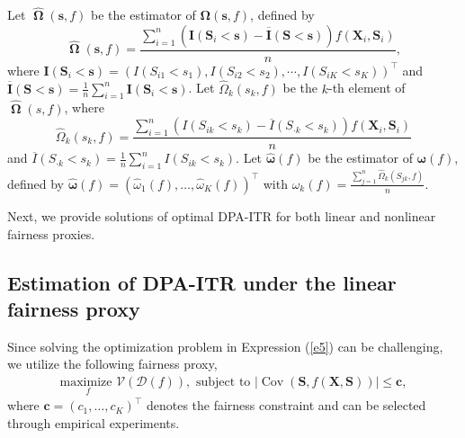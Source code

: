 \documentclass[12pt]{article}
\theoremstyle{plain}
\theoremstyle{definition}
\theoremstyle{remark}
\begin{document}
Let $\widehat{\operatorname{\boldsymbol{\Omega}}}(\boldsymbol{s},f)$ be the estimator of $\boldsymbol{\Omega}(\boldsymbol{s},f)$, defined by
$$
\widehat{\operatorname{\boldsymbol{\Omega}}}(\boldsymbol{s},f)
= \frac{\sum_{i=1}^n(\boldsymbol{I}(\boldsymbol{S}_i<\boldsymbol{s})-\overline{\boldsymbol{I}}(\boldsymbol{S}<\boldsymbol{s}))f(\boldsymbol{X}_i,\boldsymbol{S}_i)}{n},
$$
where $\boldsymbol{I}(\boldsymbol{S}_i<\boldsymbol{s})=(I({S}_{i1}<{s}_1), I({S}_{i2}<{s}_2), \cdots, I({S}_{iK}<{s}_K) )^\top$ and $\overline{\boldsymbol{I}}(\boldsymbol{S}<\boldsymbol{s})=\frac{1}{n}\sum_{i=1}^n\boldsymbol{I}(\boldsymbol{S}_i<\boldsymbol{s})$.
Let $\widehat{\Omega}_k(s_k,f)$ be the $k$-th element of $\widehat{\operatorname{\boldsymbol{\Omega}}}(s,f)$, where
$$\widehat{\Omega}_k(s_k,f)=\frac{\sum_{i=1}^n(I({S}_{ik}<{s_k})-\overline{{I}}({S}_{\cdot k}<{s_k}))f(\boldsymbol{X}_i,\boldsymbol{S}_i)}{n}$$
and $\overline{{I}}({S}_{\cdot k}<{s}_k)=\frac{1}{n}\sum_{i=1}^nI({S}_{ik}<{s}_{k})$. Let $\boldsymbol{\widehat{\omega}}(f)$ be the estimator of $\boldsymbol{\omega}(f)$, defined by $\boldsymbol{\widehat{\omega}}(f)=(\widehat{\omega}_1(f),  \ldots, \widehat{\omega}_K(f))^\top$ with $\widehat{\omega}_k(f)=\frac{\sum_{j=1}^n\widehat{{\Omega}}_k(S_{jk},f)}{n}$.


Next, we provide solutions of optimal DPA-ITR for both linear and nonlinear fairness proxies.


\subsection{Estimation of DPA-ITR under the linear fairness proxy}
Since solving the optimization problem in Expression (\ref{e5}) can be challenging, we utilize the following fairness proxy,
\begin{equation}
\label{e7}
\begin{aligned}
\underset{f}{ \text{maximize }}\mathcal{V}(\mathcal{D}(f)),
 \text { subject to } |{\operatorname{Cov}\left(\boldsymbol{S}, f(\boldsymbol{X}, \boldsymbol{S})\right)}| \leq \boldsymbol{c},
\end{aligned}
\end{equation}
where $\boldsymbol{c}=(c_1,\ldots,c_K)^\top$ denotes the fairness constraint and can be selected through empirical experiments.
\end{document}
